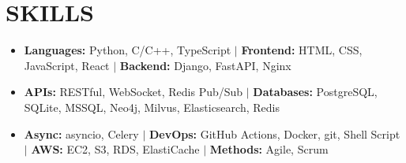 \documentclass[letterpaper,11pt]{article}
\newcommand{\resumeItem}[1]{
  \item\small{#1}
}
\newcommand{\resumeItemListStart}{\begin{itemize}[label=$\vcenter{\hbox{\tiny$\bullet$}}$]}
\newcommand{\resumeItemListEnd}{\end{itemize}}
\begin{document}
\section{SKILLS}
\resumeItemListStart
\resumeItem{\textbf{Languages:} Python, C/C++, TypeScript $|$ \textbf{Frontend:} HTML, CSS, JavaScript, React $|$ \textbf{Backend:} Django, FastAPI, Nginx}
\resumeItem{\textbf{APIs:} RESTful, WebSocket, Redis Pub/Sub $|$ \textbf{Databases:} PostgreSQL, SQLite, MSSQL, Neo4j, Milvus, Elasticsearch, Redis}
\resumeItem{\textbf{Async:} asyncio, Celery $|$ \textbf{DevOps:} GitHub Actions, Docker, git, Shell Script $|$ \textbf{AWS:} EC2, S3, RDS, ElastiCache $|$ \textbf{Methods:} Agile, Scrum}
\resumeItemListEnd
\vspace{-40pt}
\end{document}
